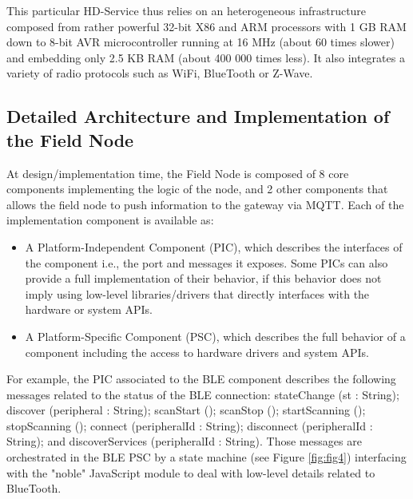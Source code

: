This particular HD-Service thus relies on an heterogeneous infrastructure composed from rather powerful 32-bit X86 and ARM processors with 1 GB RAM down to 8-bit AVR microcontroller running at 16 MHz (about 60 times slower) and embedding only 2.5 KB RAM (about 400 000 times less). It also integrates a variety of radio protocols such as WiFi, BlueTooth or Z-Wave. 

\subsection{Detailed Architecture and Implementation of the Field Node}

At design/implementation time, the Field Node is composed of 8 core components implementing the logic of the node, and 2 other components that allows the field node to push information to the gateway via MQTT. Each of the implementation component is available as: 
\begin{itemize}
\item A Platform-Independent Component (PIC), which describes the interfaces of the component i.e., the port and messages it exposes. Some PICs can also provide a full implementation of their behavior, if this behavior does not imply using low-level libraries/drivers that directly interfaces with the hardware or system APIs. 
\item A Platform-Specific Component (PSC), which describes the full behavior of a component including the access to hardware drivers and system APIs. 
\end{itemize}

For example, the PIC associated to the BLE component describes the following messages related to the status of the BLE connection: stateChange (st : String); discover (peripheral : String); scanStart (); scanStop (); startScanning (); stopScanning (); connect (peripheralId : String); disconnect (peripheralId : String); and discoverServices (peripheralId : String). Those messages are orchestrated in the BLE PSC by a state machine (see Figure \ref{fig:fig4}) interfacing with the "noble" JavaScript module to deal with low-level details related to BlueTooth. 


